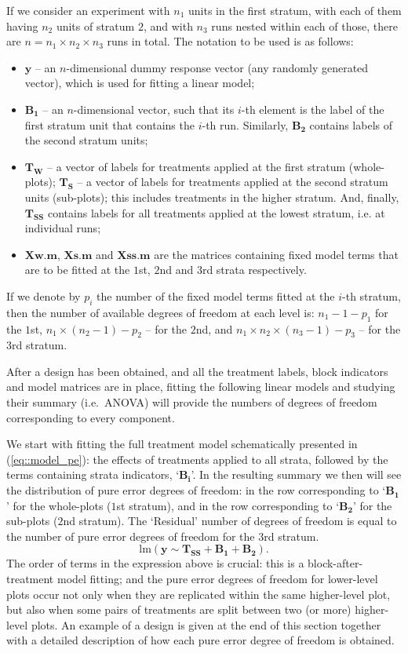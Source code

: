 If we consider an experiment with $n_1$ units in the first stratum, with each of them having $n_2$ units of stratum $2$, and with $n_3$ runs nested within each of those, there are $n=n_1\times n_2\times n_3$ runs in total. The notation to be used is as follows:
\begin{itemize}
\item $\bm{y}$ -- an $n$-dimensional dummy response vector (any randomly generated vector), which is used for fitting a linear model;
\item $\bm{B_1}$ -- an $n$-dimensional vector, such that its $i$-th element is the label of the first stratum unit that contains the $i$-th run. Similarly, $\bm{B_2}$ contains labels of the second stratum units;
\item  $\bm{T_{W}}$ -- a vector of labels for treatments applied at the first stratum (whole-plots); $\bm{T_{S}}$ -- a vector of labels for treatments applied at the second stratum units (sub-plots); this includes treatments in the higher stratum. And, finally, $\bm{T_{SS}}$ contains labels for all treatments applied at the lowest stratum, i.e. at individual runs;
\item $\bm{Xw.m}$, $\bm{Xs.m}$ and $\bm{Xss.m}$ are the matrices containing fixed model terms that are to be fitted at the $1$st, $2$nd and $3$rd strata respectively.
\end{itemize}

If we denote by $p_i$ the number of the fixed model terms fitted at the $i$-th stratum, then the number of available degrees of freedom at each level is: $n_1-1-p_1$ for the $1$st, $n_1\times(n_2-1)-p_2$ -- for the $2$nd, and $n_1\times n_2\times(n_3-1)-p_3$ -- for the $3$rd stratum.

After a design has been obtained, and all the treatment labels, block indicators and model matrices are in place, fitting the following linear models and studying their summary (i.e.~ANOVA) will provide the numbers of degrees of freedom corresponding to every component. 

We start with fitting the full treatment model schematically presented in (\ref{eq::model_pe}): the effects of treatments applied to all strata, followed by the terms containing strata indicators, `$\bm{B_i}$'. In the resulting summary we then will see the distribution of pure error degrees of freedom: in the row corresponding to `$\bm{B_1}$' for the whole-plots ($1$st stratum), and in the row corresponding to `$\bm{B_2}$' for the sub-plots ($2$nd stratum). The `Residual' number of degrees of freedom is equal to the number of pure error degrees of freedom for the $3$rd stratum.
\begin{equation}
\label{eq::model_pe}
\mathrm{lm}(\bm{y}\sim\bm{T_{SS}}+\bm{B_1}+\bm{B_2}).
\end{equation}
The order of terms in the expression above is crucial: this is a block-after-treatment model fitting; and the pure error degrees of freedom for lower-level plots occur not only when they are replicated within the same higher-level plot, but also when some pairs of treatments are split between two (or more) higher-level plots. An example of a design is given at the end of this section together with a detailed description of how each pure error degree of freedom is obtained.

